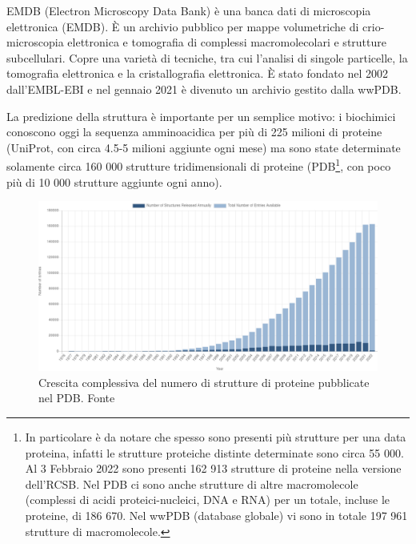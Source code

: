 \par EMDB (Electron Microscopy Data Bank) è una banca dati di microscopia elettronica (EMDB). È un archivio pubblico per mappe volumetriche di crio-microscopia elettronica e tomografia di complessi macromolecolari e strutture subcellulari. Copre una varietà di tecniche, tra cui l'analisi di singole particelle, la tomografia elettronica e la cristallografia elettronica. È stato fondato nel 2002 dall'EMBL-EBI e nel gennaio 2021 è divenuto un archivio gestito dalla wwPDB. \\

\par La predizione della struttura è importante per un semplice motivo: i biochimici conoscono oggi la sequenza amminoacidica per più di 225 milioni di proteine\supercite{proteienDBentries} (UniProt, con circa 4.5-5 milioni aggiunte ogni mese) ma sono state determinate solamente circa 160 000 strutture tridimensionali di proteine\supercite{proteienDBentries} (PDB\footnote{In particolare è da notare che spesso sono presenti più strutture per una data proteina, infatti le strutture proteiche distinte determinate sono circa 55 000. Al 3 Febbraio 2022 sono presenti 162 913 strutture di proteine nella versione dell'RCSB. Nel PDB ci sono anche strutture di altre macromolecole (complessi di acidi proteici-nucleici, DNA e RNA) per un totale, incluse le proteine, di 186 670\supercite{pdbStats}. Nel wwPDB (database globale) vi sono in totale 197 961 strutture di macromolecole\supercite{wwpdbStats}.}, con poco più di 10 000 strutture aggiunte ogni anno). 

\begin{figure}[!htb]
	\centering
	\includegraphics[scale=0.3]{images/pdb-statistica.png}
	\caption{Crescita complessiva del numero di strutture di proteine pubblicate nel PDB. Fonte\cite{pdbStats}}
	\label{fig:pdb-statistica}
\end{figure}


